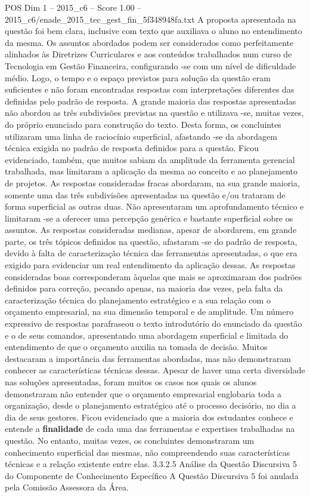 \begin{textsample}{POS Dim 1 – 2015\_c6 – Score 1.00 – 2015\_c6/enade\_2015\_tec\_gest\_fin\_5f348948fa.txt}
A proposta apresentada na questão foi bem clara, inclusive com texto que auxiliava o aluno no entendimento da mesma.
Os assuntos abordados podem ser considerados como perfeitamente alinhados às Diretrizes Curriculares e aos conteúdos trabalhados num curso de Tecnologia em Gestão Financeira, configurando -se com um nível de dificuldade médio.
Logo, o tempo e o espaço previstos para solução da questão eram suficientes e não foram encontradas respostas com interpretações diferentes das definidas pelo padrão de resposta.
A grande maioria das respostas apresentadas não abordou as três subdivisões previstas na questão e utilizava -se, muitas vezes, do próprio enunciado para construção do texto.
Desta forma, os concluintes utilizaram uma linha de raciocínio superficial, afastando -se da abordagem técnica exigida no padrão de resposta definidos para a questão.
Ficou evidenciado, também, que muitos sabiam da amplitude da ferramenta gerencial trabalhada, mas limitaram a aplicação da mesma ao conceito e ao planejamento de projetos.
As respostas consideradas fracas abordaram, na sua grande maioria, somente uma das três subdivisões apresentadas na questão e/ou trataram de forma superficial as outras duas.
Não apresentaram um aprofundamento técnico e limitaram -se a oferecer uma percepção genérica e bastante superficial sobre os assuntos.
As respostas consideradas medianas, apesar de abordarem, em grande parte, os três tópicos definidos na questão, afastaram -se do padrão de resposta, devido à falta de caracterização técnica das ferramentas apresentadas, o que era exigido para evidenciar um real entendimento da aplicação dessas.
As respostas consideradas boas corresponderam àquelas que mais se aproximaram dos padrões definidos para correção, pecando apenas, na maioria das vezes, pela falta da caracterização técnica do planejamento estratégico e a sua relação com o orçamento empresarial, na sua dimensão temporal e de amplitude.
Um número expressivo de respostas parafraseou o texto introdutório do enunciado da questão e o de seus comandos, apresentando uma abordagem superficial e limitada do entendimento de que o orçamento auxilia na tomada de decisão.
Muitos destacaram a importância das ferramentas abordadas, mas não demonstraram conhecer as características técnicas dessas.
Apesar de haver uma certa diversidade nas soluções apresentadas, foram muitos os casos nos quais os alunos demonstraram não entender que o orçamento empresarial englobaria toda a organização, desde o planejamento estratégico até o processo decisório, no dia a dia de seus gestores.
Ficou evidenciado que a maioria dos estudantes conhece e entende a \textbf{finalidade} de cada uma das ferramentas e expertises trabalhadas na questão.
No entanto, muitas vezes, os concluintes demonstraram um conhecimento superficial das mesmas, não compreendendo suas características técnicas e a relação existente entre elas. 3.3.2.5 Análise da Questão Discursiva 5 do Componente de Conhecimento Específico A Questão Discursiva 5 foi anulada pela Comissão Assessora da Área.

\end{textsample}
